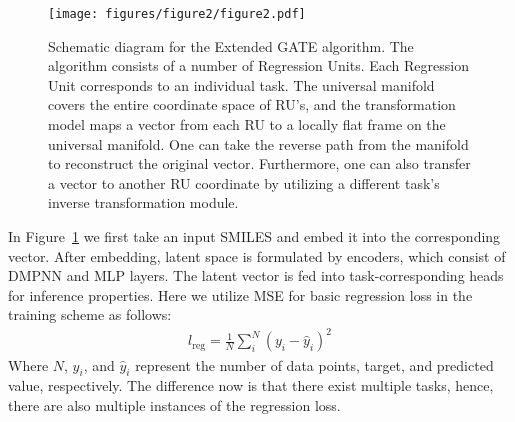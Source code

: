 \begin{figure}[t!]
\begin{center}
\texttt{[image: figures/figure2/figure2.pdf]}
\end{center}
\caption{Schematic diagram for the Extended GATE algorithm. The algorithm consists of a number of Regression Units. Each Regression Unit corresponds to an individual task. The universal manifold covers the entire coordinate space of RU's, and the transformation model maps a vector from each RU to a locally flat frame on the universal manifold. One can take the reverse path from the manifold to reconstruct the original vector. Furthermore, one can also transfer a vector to another RU coordinate by utilizing a different task's inverse transformation module.}
\label{fig:fig2}
\end{figure}

In Figure~\ref{fig:fig2} we first take an input SMILES and embed it into the corresponding vector. After embedding, latent space is formulated by encoders, which consist of DMPNN\cite{dmpnn} and MLP layers. The latent vector is fed into task-corresponding heads for inference properties. Here we utilize MSE for basic regression loss in the training scheme as follows:
\begin{gather}
    l_{\mathrm{reg}} = \frac{1}{N}\sum_{i}^{N}(y_i - \hat{y}_i)^2
\end{gather}
Where $N$, $y_i$, and $\hat{y}_i$ represent the number of data points, target, and predicted value, respectively. The difference now is that there exist multiple tasks, hence, there are also multiple instances of the regression loss.

